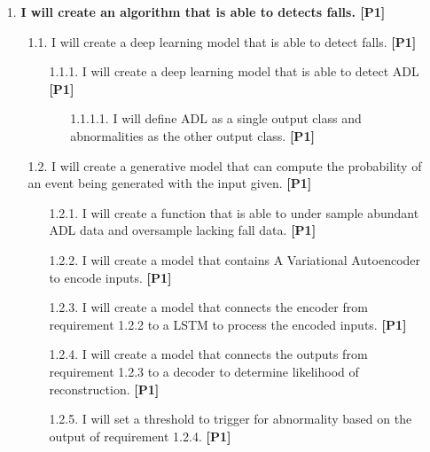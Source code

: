 \begin{enumerate}


    \item[1.] \textbf{I will create an algorithm that is able to detects falls. [P1]}
    \begin{enumerate}[label*=\arabic*.]
        \item[1.1.] I will create a deep learning model that is able to detect falls. \textbf{[P1]}
        \begin{enumerate}[label*=\arabic*.]
            \item[1.1.1.] I will create a deep learning model that is able to detect ADL \textbf{[P1]}
            \begin{enumerate}[label*=\arabic*.]
                \item[1.1.1.1.] I will define ADL as a single output class and abnormalities as the other output class. \textbf{[P1]}
            \end{enumerate}
        \end{enumerate}

    \end{enumerate}
   \begin{enumerate}[label*=\arabic*.]
        \item[1.2.] I will create a generative model that can compute the probability of an event being generated with the input given. \textbf{[P1]}
        \begin{enumerate}[label*=\arabic*.]
            \item[1.2.1.] I will create a function that is able to under sample abundant ADL data and oversample lacking fall data. \textbf{[P1]}
            \item[1.2.2.] I will create a model that contains A Variational Autoencoder to encode inputs. \textbf{[P1]}
            \item[1.2.3.] I will create a model that connects the encoder from requirement 1.2.2 to a LSTM to process the encoded inputs. \textbf{[P1]}
            \item[1.2.4.] I will create a model that connects the outputs from requirement 1.2.3 to a decoder to determine likelihood of reconstruction. \textbf{[P1]}
            \item[1.2.5.] I will set a threshold to trigger for abnormality based on the output of requirement 1.2.4. \textbf{[P1]}
        \end{enumerate}
    \end{enumerate}  
    

\end{enumerate}
